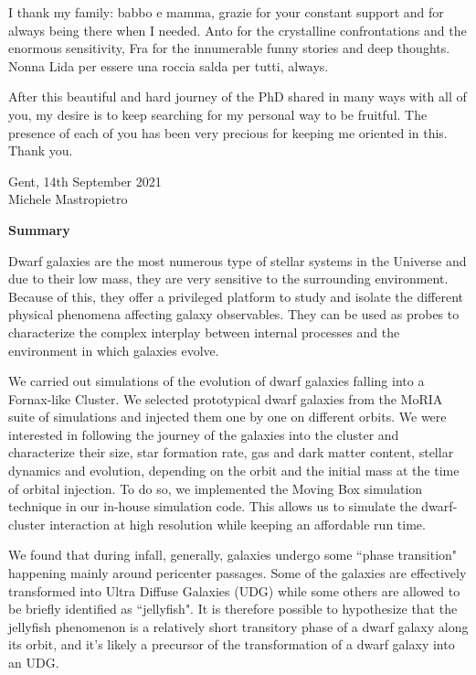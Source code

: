 {I thank my family: babbo e mamma, grazie for your constant support and for always being there when I needed.
Anto for the crystalline confrontations and the enormous sensitivity, Fra for the innumerable funny stories and deep thoughts.
Nonna Lida per essere una roccia salda per tutti, always.

After this beautiful and hard journey of the PhD shared in many ways with all of you, my desire is to keep searching for my personal way to be fruitful.
The presence of each of you has been very precious for keeping me oriented in this. Thank you.

\begin{flushright}
  Gent, 14th September 2021\\Michele Mastropietro
\end{flushright}
}

\clearpage
\thispagestyle{empty}
\null%
\label{thesis:Summary}
\begin{center}
  {\Large \textbf{Summary}}\\
\end{center}

Dwarf galaxies are the most numerous type of stellar systems in the Universe and due to their low mass, they are very sensitive to the surrounding environment.
Because of this, they offer a privileged platform to study and isolate the different physical phenomena affecting galaxy observables.
They can be used as probes to characterize the complex interplay between internal processes and the environment in which galaxies evolve.

We carried out simulations of the evolution of dwarf galaxies falling into a Fornax-like Cluster.
We selected prototypical dwarf galaxies from the MoRIA suite of simulations and injected them one by one on different orbits.
We were interested in following the journey of the galaxies into the cluster and characterize their size, star formation rate, gas and dark matter content, stellar dynamics and evolution, depending on the orbit and the initial mass at the time of orbital injection.
To do so, we implemented the Moving Box simulation technique in our in-house simulation code.
This allows us to simulate the dwarf-cluster interaction at high resolution while keeping an affordable run time.

We found that during infall, generally, galaxies undergo some ``phase transition" happening mainly around pericenter passages.
Some of the galaxies are effectively transformed into Ultra Diffuse Galaxies (UDG) while some others are allowed to be briefly identified as ``jellyfish".
It is therefore possible to hypothesize that the jellyfish phenomenon is a relatively short transitory phase of a dwarf galaxy along its orbit, and it's likely a precursor of the transformation of a dwarf galaxy into an UDG.

